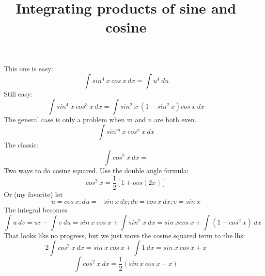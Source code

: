 \documentclass[11pt, oneside]{article}   	%
\title{Integrating products of sine and cosine}
\date{}							%
\begin{document}
\maketitle
\noindent
This one is easy:
\[
\int sin^4 \  x \ cos \  x \ dx = \int u^4 \ du
\]
Still easy:
\[
\int sin^4 \  x \ cos^3 \  x \ dx = \int sin^2 \  x \ (1-sin^2 \ x) cos \ x \ dx
\]
The general case is only a problem when m and n are both even.
\[
\int sin^m \  x \ cos^n \  x \ dx
\]
The classic:
\[
\int cos^2 \  x \ dx =
\]
Two ways to do cosine squared.  Use the double angle formula:
\[
cos^2 \  x  = \frac{1}{2} [ 1 + oos(2x) ]
\]
Or (my favorite) let
\[
u = cos \ x;  du = - sin \ x \ dx;  dv = cos \ x \ dx;  v = sin \ x
\]
The integral becomes
\[
\int u \ dv = uv - \int v \ du = sin \ x \ cos \ x + \int sin^2 \ x \ dx = sin \ x cos \ x + \int (1-cos^2 \ x) \ dx
\]
That looks like no progress, but we just move the cosine squared term to the lhs:
\[
2 \int cos^2 \  x \ dx = sin \ x \ cos \ x + \int  1 \ dx = sin \ x \ cos \ x + x
\]
\[
\int cos^2 \  x \ dx = \frac{1}{2} (sin \ x \ cos \ x + x)
\]
\end{document}
